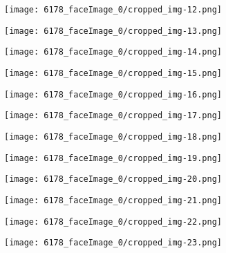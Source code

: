 \begin{figure}
{\begin{subfigure}{0.09\textwidth}
\end{subfigure}
\begin{subfigure}{0.09\textwidth}
  \centering
  \texttt{[image: 6178\_faceImage\_0/cropped\_img-12.png]}
\end{subfigure}
\begin{subfigure}{0.09\textwidth}
  \centering
  \texttt{[image: 6178\_faceImage\_0/cropped\_img-13.png]}
\end{subfigure}
\begin{subfigure}{0.09\textwidth}
  \centering
  \texttt{[image: 6178\_faceImage\_0/cropped\_img-14.png]}
\end{subfigure}
\begin{subfigure}{0.09\textwidth}
  \centering
  \texttt{[image: 6178\_faceImage\_0/cropped\_img-15.png]}
\end{subfigure}
\begin{subfigure}{0.09\textwidth}
  \centering
  \texttt{[image: 6178\_faceImage\_0/cropped\_img-16.png]}
\end{subfigure}
\begin{subfigure}{0.09\textwidth}
  \centering
  \texttt{[image: 6178\_faceImage\_0/cropped\_img-17.png]}
\end{subfigure}
\begin{subfigure}{0.09\textwidth}
  \centering
  \texttt{[image: 6178\_faceImage\_0/cropped\_img-18.png]}
\end{subfigure}
\begin{subfigure}{0.09\textwidth}
  \centering
  \texttt{[image: 6178\_faceImage\_0/cropped\_img-19.png]}
\end{subfigure}
}
\parbox{\textwidth}{
\begin{subfigure}{0.09\textwidth}
  \centering
  \texttt{[image: 6178\_faceImage\_0/cropped\_img-20.png]}
\end{subfigure}
\begin{subfigure}{0.09\textwidth}
  \centering
  \texttt{[image: 6178\_faceImage\_0/cropped\_img-21.png]}
\end{subfigure}
\begin{subfigure}{0.09\textwidth}
  \centering
  \texttt{[image: 6178\_faceImage\_0/cropped\_img-22.png]}
\end{subfigure}
\begin{subfigure}{0.09\textwidth}
  \centering
  \texttt{[image: 6178\_faceImage\_0/cropped\_img-23.png]}

\end{subfigure}}
\end{figure}

